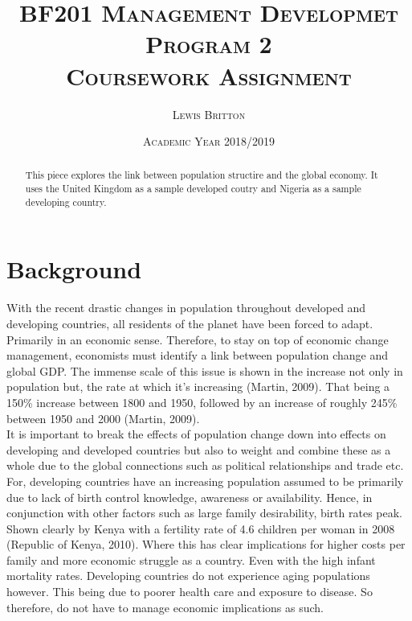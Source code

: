 \documentclass[11pt, english]{article}
\begin{document}

        \title{\textsc{BF201 Management Developmet Program 2\\ Coursework Assignment}}
        \author{\textsc{Lewis Britton}}
        \date{\textsc{Academic Year 2018/2019}}
        \maketitle
	
	\begin{abstract}
	This piece explores the link between population structire and the global economy. It uses the United Kingdom as a sample developed coutry and Nigeria as a sample developing country.
	\end{abstract}

\newpage


	\renewcommand{\contentsname}{Table of Contents}

        \tableofcontents

\newpage


\section{Background}

	With the recent drastic changes in population throughout developed and developing countries, all residents of the planet have been forced to adapt. Primarily in an economic sense. Therefore, to stay on top of economic change management, economists must identify a link between population change and global GDP. The immense scale of this issue is shown in the increase not only in population but, the rate at which it’s increasing (Martin, 2009). That being a 150\% increase between 1800 and 1950, followed by an increase of roughly 245\% between 1950 and 2000 (Martin, 2009).\\

	It is important to break the effects of population change down into effects on developing and developed countries but also to weight and combine these as a whole due to the global connections such as political relationships and trade etc. For, developing countries have an increasing population assumed to be primarily due to lack of birth control knowledge, awareness or availability. Hence, in conjunction with other factors such as large family desirability, birth rates peak. Shown clearly by Kenya with a fertility rate of 4.6 children per woman in 2008 (Republic of Kenya, 2010). Where this has clear implications for higher costs per family and more economic struggle as a country. Even with the high infant mortality rates. Developing countries do not experience aging populations however. This being due to poorer health care and exposure to disease. So therefore, do not have to manage economic implications as such.\\
\end{document}
